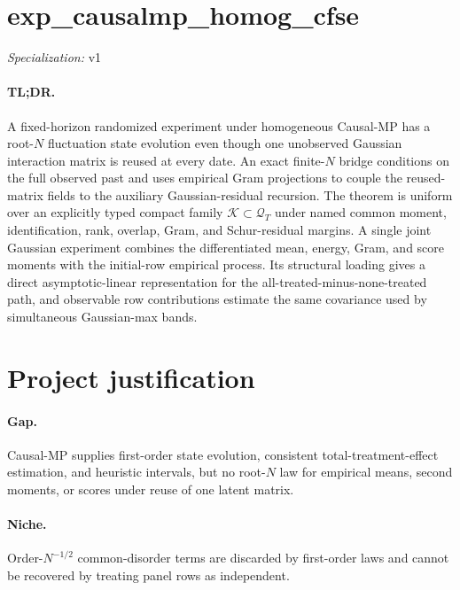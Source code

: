 \documentclass{article}
\begin{document}
\sloppy

\section*{exp\_\allowbreak{}causalmp\_\allowbreak{}homog\_\allowbreak{}cfse}

\noindent\textit{Specialization:} v1\par

\paragraph{TL;DR.} A fixed-horizon randomized experiment under homogeneous Causal-MP has a root-\(N\) fluctuation state evolution even though one unobserved Gaussian interaction matrix is reused at every date. An exact finite-\(N\) bridge conditions on the full observed past and uses empirical Gram projections to couple the reused-matrix fields to the auxiliary Gaussian-residual recursion. The theorem is uniform over an explicitly typed compact family \(\mathcal K\subset\mathcal Q_T\) under named common moment, identification, rank, overlap, Gram, and Schur-residual margins. A single joint Gaussian experiment combines the differentiated mean, energy, Gram, and score moments with the initial-row empirical process. Its structural loading gives a direct asymptotic-linear representation for the all-treated-minus-none-treated path, and observable row contributions estimate the same covariance used by simultaneous Gaussian-max bands.

\section{Project justification}

\paragraph{Gap.} Causal-MP supplies first-order state evolution, consistent total-treatment-effect estimation, and heuristic intervals, but no root-\(N\) law for empirical means, second moments, or scores under reuse of one latent matrix.

\paragraph{Niche.} Order-\(N^{-1/2}\) common-disorder terms are discarded by first-order laws and cannot be recovered by treating panel rows as independent.
\end{document}
